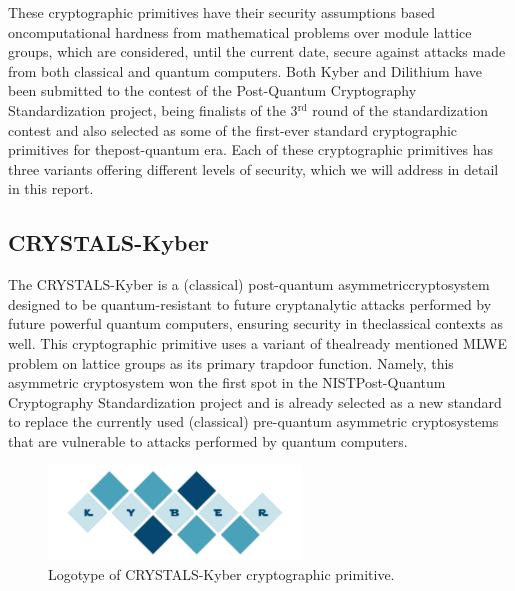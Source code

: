 \documentclass[runningheads]{llncs}
\numberwithin{equation}{section}
\begin{document}
    These cryptographic primitives have their security assumptions based on\break computational hardness from mathematical problems over module lattice groups, which are considered, until the current date, secure against attacks made from both classical and quantum computers. Both Kyber and Dilithium have been submitted to the contest of the Post-Quantum Cryptography Standardization project, being finalists of the 3${}^{\mathrm{rd}}$ round of the standardization contest and also selected as some of the first-ever standard cryptographic primitives for the\break post-quantum era. Each of these cryptographic primitives has three variants offering different levels of security, which we will address in detail in this report.

    \vspace{-1ex}
    \subsection{CRYSTALS-Kyber}
    \label{subsec:crystals-kyber}

    The CRYSTALS-Kyber \cite{bos-et-al:crystals-kyber-cca-secure-module-lattice-based-kem:2018:06-2024,avanzi-et-al:crystals-kyber-algorithm-specifications-and-supporting-documentation:2019:06-2024} is a (classical) post-quantum asymmetric\break cryptosystem designed to be quantum-resistant to future cryptanalytic attacks performed by future powerful quantum computers, ensuring security in the\break classical contexts as well. This cryptographic primitive uses a variant of the\break already mentioned MLWE problem on lattice groups as its primary trapdoor function. Namely, this asymmetric cryptosystem won the first spot in the NIST\break Post-Quantum Cryptography Standardization project and is already selected as a new standard to replace the currently used (classical) pre-quantum asymmetric cryptosystems that are vulnerable to attacks performed by quantum computers.

    \vspace{-3ex}
    \begin{figure}[!ht]
        \centering
        \captionsetup{justification=centering}
        \includegraphics[width=0.6\textwidth]{figures/sections/section-3/crystals-kyber.pdf}
        \caption{Logotype of CRYSTALS-Kyber cryptographic primitive.}
        \label{fig:crystals-kyber-logo}
    \end{figure}
\end{document}
